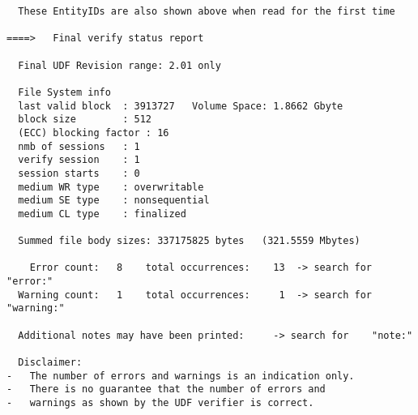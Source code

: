 \begin{lstlisting}
  These EntityIDs are also shown above when read for the first time

====>   Final verify status report

  Final UDF Revision range: 2.01 only

  File System info
  last valid block  : 3913727   Volume Space: 1.8662 Gbyte
  block size        : 512
  (ECC) blocking factor : 16
  nmb of sessions   : 1
  verify session    : 1
  session starts    : 0       
  medium WR type    : overwritable
  medium SE type    : nonsequential
  medium CL type    : finalized

  Summed file body sizes: 337175825 bytes   (321.5559 Mbytes)

    Error count:   8    total occurrences:    13  -> search for   "error:"
  Warning count:   1    total occurrences:     1  -> search for "warning:"

  Additional notes may have been printed:     -> search for    "note:"

  Disclaimer:
-   The number of errors and warnings is an indication only.
-   There is no guarantee that the number of errors and
-   warnings as shown by the UDF verifier is correct.
\end{lstlisting}
\pagebreak
